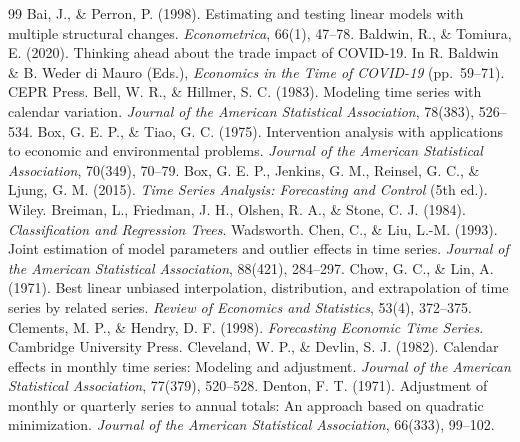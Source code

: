 \documentclass{article}
\theoremstyle{plain}
\theoremstyle{definition}
\theoremstyle{remark}
\begin{document}
\begin{thebibliography}{99}
\setlength{\itemsep}{1pt}\small
{} Bai, J., \& Perron, P. (1998). Estimating and testing linear models with multiple structural changes. \emph{Econometrica}, 66(1), 47--78.
 Baldwin, R., \& Tomiura, E. (2020). Thinking ahead about the trade impact of COVID-19. In R. Baldwin \& B. Weder di Mauro (Eds.), \emph{Economics in the Time of COVID-19} (pp.\ 59--71). CEPR Press.
 Bell, W. R., \& Hillmer, S. C. (1983). Modeling time series with calendar variation. \emph{Journal of the American Statistical Association}, 78(383), 526--534.
 Box, G. E. P., \& Tiao, G. C. (1975). Intervention analysis with applications to economic and environmental problems. \emph{Journal of the American Statistical Association}, 70(349), 70--79.
 Box, G. E. P., Jenkins, G. M., Reinsel, G. C., \& Ljung, G. M. (2015). \emph{Time Series Analysis: Forecasting and Control} (5th ed.). Wiley.
 Breiman, L., Friedman, J. H., Olshen, R. A., \& Stone, C. J. (1984). \emph{Classification and Regression Trees}. Wadsworth.
 Chen, C., \& Liu, L.-M. (1993). Joint estimation of model parameters and outlier effects in time series. \emph{Journal of the American Statistical Association}, 88(421), 284--297.
 Chow, G. C., \& Lin, A. (1971). Best linear unbiased interpolation, distribution, and extrapolation of time series by related series. \emph{Review of Economics and Statistics}, 53(4), 372--375.
 Clements, M. P., \& Hendry, D. F. (1998). \emph{Forecasting Economic Time Series}. Cambridge University Press.
 Cleveland, W. P., \& Devlin, S. J. (1982). Calendar effects in monthly time series: Modeling and adjustment. \emph{Journal of the American Statistical Association}, 77(379), 520--528.
 Denton, F. T. (1971). Adjustment of monthly or quarterly series to annual totals: An approach based on quadratic minimization. \emph{Journal of the American Statistical Association}, 66(333), 99--102.

\end{thebibliography}
\end{document}

